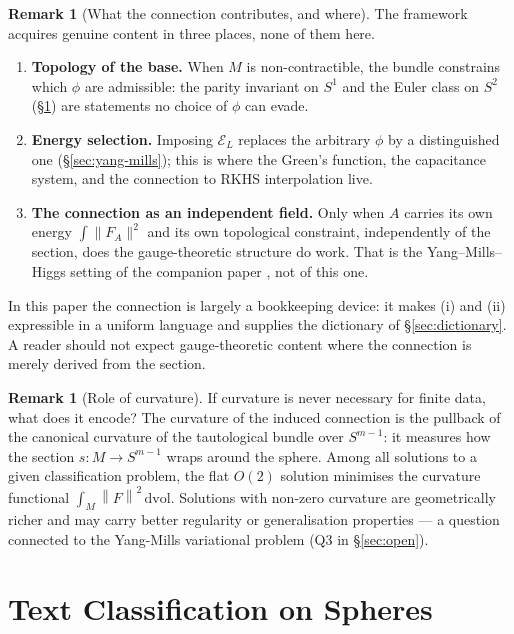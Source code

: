 \documentclass[11pt, a4paper]{article}
\theoremstyle{plain}
\theoremstyle{definition}
\newtheorem{remark}[theorem]{Remark}
\newcommand{\norm}[1]{\left\|#1\right\|}
\begin{document}
\begin{remark}[What the connection contributes, and where]
The framework acquires genuine content in three places, none of them here.
\begin{enumerate}[label=(\roman*), itemsep=2pt]
  \item \textbf{Topology of the base.} When $M$ is non-contractible, the bundle
        constrains which $\phi$ are admissible: the parity invariant on $S^1$
        and the Euler class on $S^2$ (\S\ref{sec:sphere}) are statements no
        choice of $\phi$ can evade.
  \item \textbf{Energy selection.} Imposing $\mathcal{E}_L$ replaces the
        arbitrary $\phi$ by a distinguished one (\S\ref{sec:yang-mills}); this
        is where the Green's function, the capacitance system, and the
        connection to RKHS interpolation live.
  \item \textbf{The connection as an independent field.} Only when $A$ carries
        its own energy $\int\|F_A\|^2$ and its own topological constraint,
        independently of the section, does the gauge-theoretic structure do
        work. That is the Yang--Mills--Higgs setting of the companion paper
        \cite{Vasii2026Paper2}, not of this one.
\end{enumerate}
In this paper the connection is largely a bookkeeping device: it makes (i) and
(ii) expressible in a uniform language and supplies the dictionary of
\S\ref{sec:dictionary}. A reader should not expect gauge-theoretic content
where the connection is merely derived from the section.
\end{remark}

\begin{remark}[Role of curvature]
If curvature is never necessary for finite data, what does it encode?
The curvature of the induced connection is the pullback of the canonical
curvature of the tautological bundle over $S^{m-1}$: it measures how the
section $s\colon M \to S^{m-1}$ wraps around the sphere. Among all solutions
to a given classification problem, the flat $O(2)$ solution minimises the
curvature functional $\int_M\norm{F}^2\,\mathrm{dvol}$. Solutions with non-zero
curvature are geometrically richer and may carry better regularity or
generalisation properties --- a question connected to the Yang-Mills variational
problem \cite{atiyah1983} (Q3 in \S\ref{sec:open}).
\end{remark}

\section{Text Classification on Spheres}\label{sec:sphere}
\end{document}
